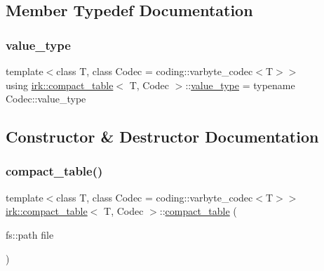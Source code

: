 \subsection{Member Typedef Documentation}
\mbox{\label{classirk_1_1compact__table_a1c0c667110b82f790a0c0088e53ff461}} 
\subsubsection{\texorpdfstring{value\+\_\+type}{value\_type}}
{\footnotesize\ttfamily template$<$class T, class Codec = coding\+::varbyte\+\_\+codec$<$\+T$>$$>$ \\
using \mbox{\hyperlink{classirk_1_1compact__table}{irk\+::compact\+\_\+table}}$<$ T, Codec $>$\+::\mbox{\hyperlink{classirk_1_1compact__table_a1c0c667110b82f790a0c0088e53ff461}{value\+\_\+type}} =  typename Codec\+::value\+\_\+type}



\subsection{Constructor \& Destructor Documentation}
\mbox{\label{classirk_1_1compact__table_a7a5ea0a767cf151a37639532e36712f3}} 
\subsubsection{\texorpdfstring{compact\+\_\+table()}{compact\_table()}\hspace{0.1cm}{\footnotesize\ttfamily [1/2]}}
{\footnotesize\ttfamily template$<$class T, class Codec = coding\+::varbyte\+\_\+codec$<$\+T$>$$>$ \\
\mbox{\hyperlink{classirk_1_1compact__table}{irk\+::compact\+\_\+table}}$<$ T, Codec $>$\+::\mbox{\hyperlink{classirk_1_1compact__table}{compact\+\_\+table}} (\begin{DoxyParamCaption}\item[{fs\+::path}]{file }\end{DoxyParamCaption})\hspace{0.3cm}{\ttfamily [inline]}}

